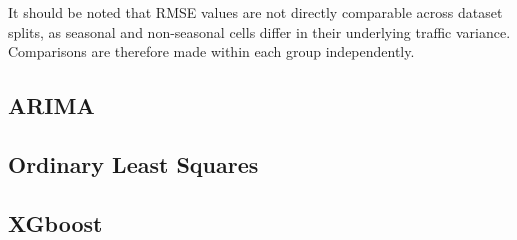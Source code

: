 It should be noted that RMSE values are not directly comparable across dataset splits, as seasonal and non-seasonal cells differ in their underlying traffic variance. Comparisons are therefore made within each group independently. \\

\subsection{ARIMA}



\subsection{Ordinary Least Squares}


\subsection{XGboost}









 
 